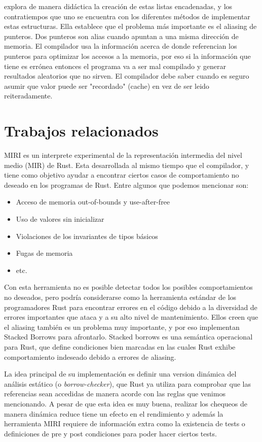  explora de manera didáctica la creación de estas listas encadenadas, y los contratiempos que uno se encuentra con los diferentes métodos de implementar estas estructuras. Ella establece que el problema más importante es el aliasing de punteros. Dos punteros son alias cuando apuntan a una misma dirección de memoria. El compilador usa la información acerca de donde referencian los punteros para optimizar los accesos a la memoria, por eso si la información que tiene es errónea entonces el programa va a ser mal compilado y generar resultados aleatorios que no sirven. El compilador debe saber cuando es seguro asumir que valor puede ser "recordado" (cache) en vez de ser leido reiteradamente.

\section{Trabajos relacionados}

MIRI \cite{miri} es un interprete experimental de la representación intermedia del nivel medio (MIR) de Rust. Esta desarrollada al mismo tiempo que el compilador, y tiene como objetivo ayudar a encontrar ciertos casos de comportamiento no deseado en los programas de Rust. Entre algunos que podemos mencionar son:
\begin{itemize}
    \item Acceso de memoria out-of-bounds y use-after-free
    \item Uso de valores sin inicializar
    \item Violaciones de los invariantes de tipos básicos
    \item Fugas de memoria
    \item etc.
\end{itemize}
Con esta herramienta no es posible detectar todos los posibles comportamientos no deseados, pero podría considerarse como la herramienta estándar de los programadores Rust para encontrar errores en el código debido a la diversidad de errores importantes que ataca y a su alto nivel de mantenimiento. Ellos creen que el aliasing también es un problema muy importante, y por eso implementan Stacked Borrows \cite{stackedborrows} para afrontarlo. Stacked borrows es una semántica operacional  para Rust, que define condiciones bien marcadas en las cuales Rust exhibe comportamiento indeseado debido a errores de aliasing.

La idea principal de su implementación es definir una version dinámica del análisis estático (o \textit{borrow-checker}), que Rust ya utiliza para comprobar que las referencias sean accedidas de manera acorde con las reglas que venimos mencionando. A pesar de que esta idea es muy buena, realizar los chequeos de manera dinámica reduce tiene un efecto en el rendimiento y además la herramienta MIRI requiere de información extra como la existencia de tests o definiciones de pre y post condiciones para poder hacer ciertos tests.

